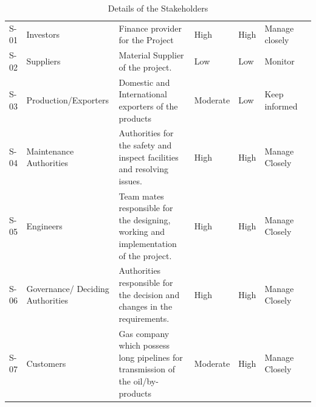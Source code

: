\documentclass[a4paper]{article}
\begin{document}
\begin{table}[htb]
\caption{Details of the Stakeholders}
\label{2.1}
    \footnotesize
    \setlength\tabcolsep{3pt}
\begin{tabularx}{\linewidth}{@{} l
              >{\hsize}L
              >{\hsize}L
                            *{2}{L}*{2}{L}
                @{}}
    \toprule
{}
    &   
        &   
            &   
                &                
                    & \\
    \midrule
S-01  & Investors
        & Finance provider for the Project
            & High
                & High
                & Manage closely\\
    \addlinespace
S-02  & Suppliers
        & Material Supplier of the project. 
            & Low
                & Low
                    & Monitor\\
    \addlinespace
S-03   & Production/Exporters
        & Domestic and International \quad
        exporters of the products
            & Moderate
                & Low
                    & Keep informed\\
    \addlinespace
S-04   & Maintenance Authorities
        & Authorities for the safety and inspect facilities
        and resolving issues.
            & High
                & High
                    & Manage Closely\\
    \addlinespace
S-05   & Engineers
        & Team mates responsible for the designing, working and implementation of the project.
            & High
                & High
                    & Manage Closely\\
    \addlinespace
S-06   & Governance/ Deciding Authorities
        & Authorities responsible for the decision and changes in the requirements.
            & High
                & High
                    & Manage Closely\\
    \addlinespace
S-07   & Customers
        & Gas company which possess long pipelines for transmission of the oil/by-products
            & Moderate
                & High
                    & Manage Closely\\
    \bottomrule
\end{tabularx}
    \end{table}
\end{document}
